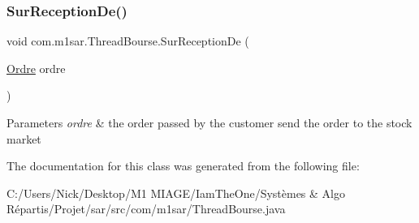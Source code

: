 \subsubsection{\texorpdfstring{Sur\+Reception\+De()}{SurReceptionDe()}}
{\footnotesize\ttfamily void com.\+m1sar.\+Thread\+Bourse.\+Sur\+Reception\+De (\begin{DoxyParamCaption}\item[{\hyperlink{classcom_1_1m1sar_1_1_ordre}{Ordre}}]{ordre }\end{DoxyParamCaption})}


\begin{DoxyParams}{Parameters}
{\em ordre} & the order passed by the customer send the order to the stock market \\
\hline
\end{DoxyParams}


The documentation for this class was generated from the following file\+:\begin{DoxyCompactItemize}
\item 
C\+:/\+Users/\+Nick/\+Desktop/\+M1 M\+I\+A\+G\+E/\+Iam\+The\+One/\+Systèmes \& Algo Répartis/\+Projet/sar/src/com/m1sar/Thread\+Bourse.\+java\end{DoxyCompactItemize}
